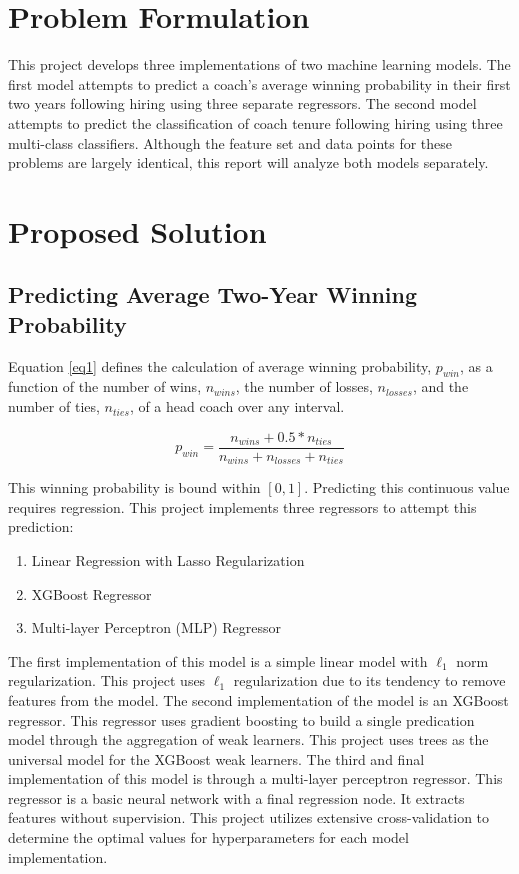 \documentclass[conference]{IEEEtran}
\begin{document}
\section{Problem Formulation}
This project develops three implementations of two machine learning models. The first model attempts to predict a coach's average winning probability in their first two years following hiring using three separate regressors. The second model attempts to predict the classification of coach tenure following hiring using three multi-class classifiers. Although the feature set and data points for these problems are largely identical, this report will analyze both models separately.

\section{Proposed Solution}

\subsection{Predicting Average Two-Year Winning Probability}
Equation \eqref{eq1} defines the calculation of average winning probability, $p_{win}$, as a function of the number of wins, $n_{wins}$, the number of losses, $n_{losses}$, and the number of ties, $n_{ties}$, of a head coach over any interval. 

\begin{equation}
        p_{win}=\frac{n_{wins} + 0.5*n_{ties}}{n_{wins} + n_{losses} + n_{ties}}
        \label{eq1}
\end{equation}

This winning probability is bound within $[0, 1]$. Predicting this continuous value requires regression. This project implements three regressors to attempt this prediction: 
\begin{enumerate}
  \item Linear Regression with Lasso Regularization\cite{b7}
  \item XGBoost Regressor\cite{b8}
  \item Multi-layer Perceptron (MLP) Regressor\cite{b7}
\end{enumerate}

The first implementation of this model is a simple linear model with $\ell_1$ norm regularization. This project uses $\ell_1$ regularization due to its tendency to remove features from the model. The second implementation of the model is an XGBoost regressor. This regressor uses gradient boosting to build a single predication model through the aggregation of weak learners. This project uses trees as the universal model for the XGBoost weak learners. The third and final implementation of this model is through a multi-layer perceptron regressor. This regressor is a basic neural network with a final regression node. It extracts features without supervision. This project utilizes extensive cross-validation to determine the optimal values for hyperparameters for each model implementation. 
\end{document}
